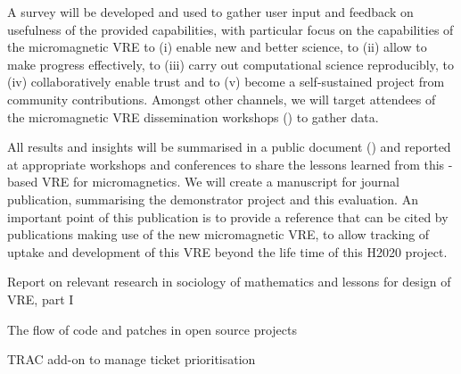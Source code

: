 \begin{workpackage}[id=social-aspects,wphases=0-48,
  title=Social Aspects,
  lead=UO,
  UORM=23,USHRM=18,USORM=6]
\begin{tasklist}
\begin{task}[title=Evaluation of Micromagnetic VRE,lead=USO,PM=6,
id=oommf-nb-evaluation,partners={UO,PS}]
  A survey will be developed and used to gather user input and
  feedback on usefulness of the provided capabilities, with particular
  focus on the capabilities of the micromagnetic VRE to (i) enable new
  and better science, to (ii) allow to make progress effectively, to
  (iii) carry out computational science reproducibly, to (iv)
  collaboratively enable trust and to (v) become a self-sustained
  project from community contributions. Amongst other channels, we
  will target attendees of the micromagnetic VRE dissemination
  workshops () to
  gather data.

  All results and insights will be summarised in a public document
  () and reported at appropriate
  workshops and conferences to share the lessons learned from this
  \Jupyter-based VRE for micromagnetics. We will create a manuscript
  for journal publication, summarising the demonstrator project and
  this evaluation. An important point of this publication is to
  provide a reference that can be cited by publications making use of
  the new micromagnetic VRE, to allow tracking of uptake and
  development of this VRE beyond the life time of this H2020 project.
\end{task}



\end{tasklist}


\begin{wpdelivs}
\begin{wpdeliv}[due=3,id=social-report,dissem=PU,nature=R,lead=UO]
 {Report on relevant research in sociology of mathematics and lessons
   for design of \TheProject VRE, part I}
\end{wpdeliv}

\begin{wpdeliv}[due=18,id=social-datareport,dissem=PU,nature=R,lead=UO]
{The flow of code and patches in open source projects}
\end{wpdeliv}

\begin{wpdeliv}[due=24,id=social-tracaddon,dissem=PU,nature=OTHER,lead=UO]
{TRAC add-on to manage ticket prioritisation}
\end{wpdeliv}


\end{wpdelivs}
\end{workpackage}
